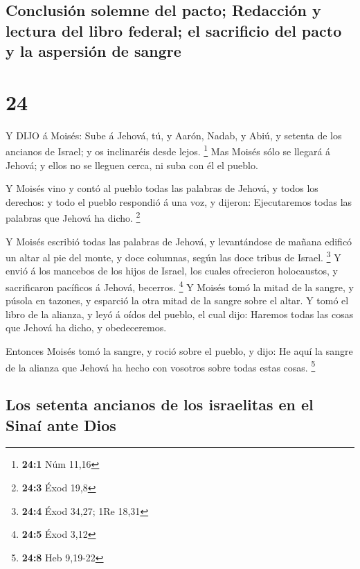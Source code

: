 \hypertarget{conclusiuxf3n-solemne-del-pacto-redacciuxf3n-y-lectura-del-libro-federal-el-sacrificio-del-pacto-y-la-aspersiuxf3n-de-sangre}{%
\subsection{Conclusión solemne del pacto; Redacción y lectura del libro
federal; el sacrificio del pacto y la aspersión de
sangre}\label{conclusiuxf3n-solemne-del-pacto-redacciuxf3n-y-lectura-del-libro-federal-el-sacrificio-del-pacto-y-la-aspersiuxf3n-de-sangre}}

\hypertarget{section-23}{%
\section{24}\label{section-23}}

 Y DIJO á Moisés: Sube á Jehová, tú, y Aarón, Nadab, y Abiú,
y setenta de los ancianos de Israel; y os inclinaréis desde lejos.
\footnote{\textbf{24:1} Núm 11,16}  Mas Moisés sólo se
llegará á Jehová; y ellos no se lleguen cerca, ni suba con él el pueblo.

 Y Moisés vino y contó al pueblo todas las palabras de
Jehová, y todos los derechos: y todo el pueblo respondió á una voz, y
dijeron: Ejecutaremos todas las palabras que Jehová ha dicho.
\footnote{\textbf{24:3} Éxod 19,8}

 Y Moisés escribió todas las palabras de Jehová, y
levantándose de mañana edificó un altar al pie del monte, y doce
columnas, según las doce tribus de Israel. \footnote{\textbf{24:4} Éxod
  34,27; 1Re 18,31}  Y envió á los mancebos de los hijos de
Israel, los cuales ofrecieron holocaustos, y sacrificaron pacíficos á
Jehová, becerros. \footnote{\textbf{24:5} Éxod 3,12}  Y
Moisés tomó la mitad de la sangre, y púsola en tazones, y esparció la
otra mitad de la sangre sobre el altar.  Y tomó el libro de
la alianza, y leyó á oídos del pueblo, el cual dijo: Haremos todas las
cosas que Jehová ha dicho, y obedeceremos.

 Entonces Moisés tomó la sangre, y roció sobre el pueblo, y
dijo: He aquí la sangre de la alianza que Jehová ha hecho con vosotros
sobre todas estas cosas. \footnote{\textbf{24:8} Heb 9,19-22}

\hypertarget{los-setenta-ancianos-de-los-israelitas-en-el-sinauxed-ante-dios}{%
\subsection{Los setenta ancianos de los israelitas en el Sinaí ante
Dios}\label{los-setenta-ancianos-de-los-israelitas-en-el-sinauxed-ante-dios}}

